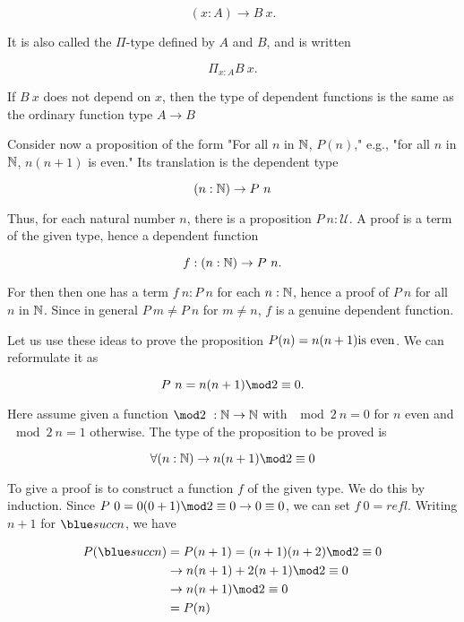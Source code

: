 \begin{equation}
(x : A) \to B\ x.
\end{equation}

It  is also called the $\Pi$-type defined by $A$ and $B$, and is written

\begin{equation}
\Pi_{x: A}B\ x.
\end{equation}

If $B\ x$ does not depend on $x$, then the type of dependent functions is the same as the ordinary function type $A \to B$

Consider now a proposition of the form "For all $n$ in $\mathbb{N}$, $P(n)$,"  e.g., "for all $n$ in $\mathbb{N}$, $n(n+1)$ is even." Its translation is the dependent type

\begin{equation}
(n : \mathbb{N}) \to P\ n
\end{equation}

Thus, for each natural number $n$, there is a proposition $P\ n : \mathcal{U}$.
A proof is a term of the given type, hence a dependent function

$$
   f : (n : \mathbb{N}) \to P\ n.
$$

For then then one has a term $f\ n : P\ n$ for each $n : \mathbb{N}$, hence a proof of $P\ n$ for all $n$ in $\mathbb{N}$.  Since in general $P\ m \ne P\ n$ for  $m \ne n$,  $f$ is a genuine dependent function.

Let us use these ideas to prove the proposition $P(n) = n(n+1)\space \text{is even}$.  We can reformulate it as 

$$
P\ n = n(n+1)\space \mod2 \equiv 0.
$$  

Here assume given a function $\mod2\  : \bbN \to \bbN$ with $\mod2\ n = 0$ for $n$ even and $\mod2\ n = 1$ otherwise.  The type of the proposition to be proved is

\begin{equation}
\forall (n : \bbN) \to  n(n+1)\space \mod2 \equiv 0
\end{equation}

To give a proof is to construct a function $f$ of the given type.  We do this by induction.  Since $P\ 0 = 0(0 + 1)\space \mod2 \equiv 0 \to 0 \equiv 0$, we can set $f\ 0 = refl$.  Writing $n + 1$ for $\suc n$, we have

\begin{align}
P(\suc n) & = P(n+1) = (n+1)(n+2)\space \mod2 \equiv 0 \\
     & \to n(n+1) + 2(n+1)\space \mod2 \equiv 0 \\
     & \to n(n + 1)\space \mod2 \equiv 0 \\
     & = P(n) 
\end{align}

